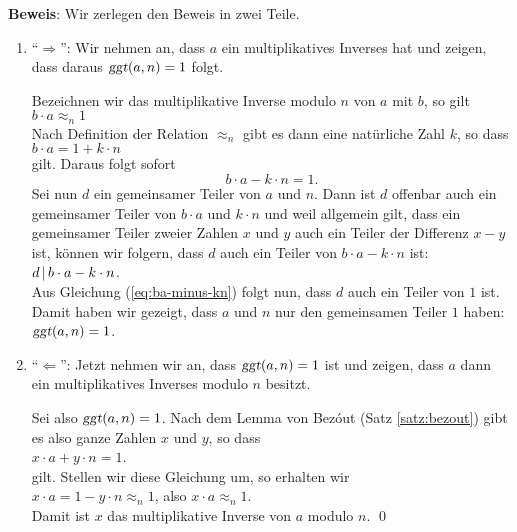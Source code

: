 \noindent
\textbf{Beweis}: Wir zerlegen den Beweis in zwei Teile.
\begin{enumerate}
\item ``$\Rightarrow$'':  Wir nehmen an, dass $a$ ein multiplikatives Inverses hat und zeigen,
      dass daraus $\textsl{ggt}(a,n) = 1$ folgt.

      Bezeichnen wir das multiplikative Inverse modulo $n$ von $a$ mit $b$, so gilt
      \\[0.2cm]
      \hspace*{1.3cm}
      $b \cdot a \approx_n 1$
      \\[0.2cm]
      Nach Definition der Relation $\approx_n$ gibt es dann eine nat\"{u}rliche Zahl $k$, so dass
      \\[0.2cm]
      \hspace*{1.3cm}
      $b \cdot a = 1 + k \cdot n$
      \\[0.2cm]
      gilt.  Daraus folgt sofort
      \begin{equation}
        \label{eq:ba-minus-kn}
      b \cdot a - k \cdot n = 1.         
      \end{equation}
      Sei nun $d$ ein gemeinsamer Teiler von $a$ und $n$.  Dann ist $d$ offenbar auch ein
      gemeinsamer Teiler von $b \cdot a$ und $k \cdot n$ und weil allgemein gilt, dass ein
      gemeinsamer Teiler zweier Zahlen $x$ und $y$ auch ein Teiler der Differenz $x - y$ ist, 
      k\"{o}nnen wir folgern, dass $d$ auch ein Teiler von $b \cdot a - k \cdot n$ ist:
      \\[0.2cm]
      \hspace*{1.3cm}
      $d \,|\, b \cdot a - k \cdot n$.
      \\[0.2cm]
      Aus Gleichung (\ref{eq:ba-minus-kn}) folgt nun, dass $d$ auch ein Teiler von $1$ ist.
      Damit haben wir gezeigt, dass $a$ und $n$ nur den gemeinsamen Teiler $1$ haben:
      \\[0.2cm]
      \hspace*{1.3cm}
      $\textsl{ggt}(a, n) = 1$.
\item ``$\Leftarrow$'': Jetzt nehmen wir an, dass $\textsl{ggt}(a, n) = 1$ ist und zeigen, dass
      $a$ dann ein multiplikatives Inverses modulo $n$ besitzt.

      Sei also $\textsl{ggt}(a, n) = 1$.  Nach dem Lemma von Bez\'out (Satz \ref{satz:bezout})
      gibt es also ganze Zahlen $x$ und $y$, so dass 
      \\[0.2cm]
      \hspace*{1.3cm}
      $x \cdot a + y \cdot n = 1$.
      \\[0.2cm]
      gilt. Stellen wir diese Gleichung um, so erhalten wir
      \\[0.2cm]
      \hspace*{1.3cm}
      $x \cdot a = 1 - y \cdot n \approx_n 1$, \quad also $x \cdot a \approx_n 1$.
      \\[0.2cm]
      Damit ist $x$ das multiplikative Inverse von $a$ modulo $n$. \qed
\end{enumerate}

